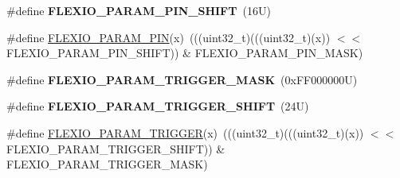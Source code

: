 \begin{DoxyCompactItemize}
\mbox{\label{group___f_l_e_x_i_o___register___masks_gadd422b82ac433804ef5f552df706298d}} 
\#define {\bfseries F\+L\+E\+X\+I\+O\+\_\+\+P\+A\+R\+A\+M\+\_\+\+P\+I\+N\+\_\+\+S\+H\+I\+FT}~(16\+U)
\item 
\#define \mbox{\hyperlink{group___f_l_e_x_i_o___register___masks_ga4169d543dfa4cdab05fe72067fa8e34e}{F\+L\+E\+X\+I\+O\+\_\+\+P\+A\+R\+A\+M\+\_\+\+P\+IN}}(x)~(((uint32\+\_\+t)(((uint32\+\_\+t)(x)) $<$$<$ F\+L\+E\+X\+I\+O\+\_\+\+P\+A\+R\+A\+M\+\_\+\+P\+I\+N\+\_\+\+S\+H\+I\+FT)) \& F\+L\+E\+X\+I\+O\+\_\+\+P\+A\+R\+A\+M\+\_\+\+P\+I\+N\+\_\+\+M\+A\+SK)
\item 
\mbox{\label{group___f_l_e_x_i_o___register___masks_gacc1d0739f5ea50f9dbe00f347143796d}} 
\#define {\bfseries F\+L\+E\+X\+I\+O\+\_\+\+P\+A\+R\+A\+M\+\_\+\+T\+R\+I\+G\+G\+E\+R\+\_\+\+M\+A\+SK}~(0x\+F\+F000000\+U)
\item 
\mbox{\label{group___f_l_e_x_i_o___register___masks_gaa5c1716b191b318d5443e19a414e1dc1}} 
\#define {\bfseries F\+L\+E\+X\+I\+O\+\_\+\+P\+A\+R\+A\+M\+\_\+\+T\+R\+I\+G\+G\+E\+R\+\_\+\+S\+H\+I\+FT}~(24\+U)
\item 
\#define \mbox{\hyperlink{group___f_l_e_x_i_o___register___masks_ga3284d94345df030a1a0963de4d08fcb4}{F\+L\+E\+X\+I\+O\+\_\+\+P\+A\+R\+A\+M\+\_\+\+T\+R\+I\+G\+G\+ER}}(x)~(((uint32\+\_\+t)(((uint32\+\_\+t)(x)) $<$$<$ F\+L\+E\+X\+I\+O\+\_\+\+P\+A\+R\+A\+M\+\_\+\+T\+R\+I\+G\+G\+E\+R\+\_\+\+S\+H\+I\+FT)) \& F\+L\+E\+X\+I\+O\+\_\+\+P\+A\+R\+A\+M\+\_\+\+T\+R\+I\+G\+G\+E\+R\+\_\+\+M\+A\+SK)
\end{DoxyCompactItemize}
